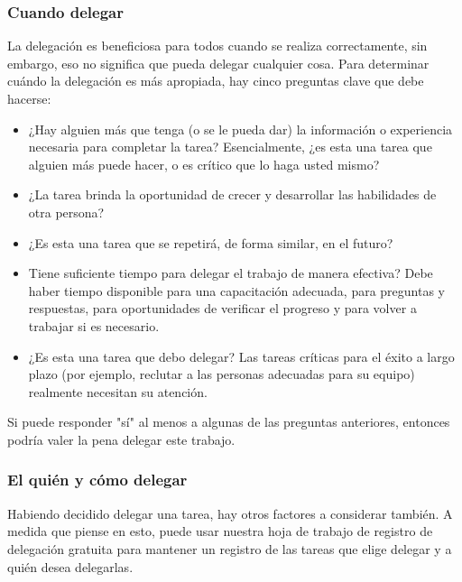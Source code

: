 \documentclass[10pt]{book}
\begin{document}
\subsubsection{Cuando delegar}
La delegación es beneficiosa para todos cuando se realiza correctamente, sin embargo, eso no significa que pueda delegar cualquier cosa. Para determinar cuándo la delegación es más apropiada, hay cinco preguntas clave que debe hacerse:
\begin{itemize}
\item ¿Hay alguien más que tenga (o se le pueda dar) la información o experiencia necesaria para completar la tarea? Esencialmente, ¿es esta una tarea que alguien más puede hacer, o es crítico que lo haga usted mismo?
\item ¿La tarea brinda la oportunidad de crecer y desarrollar las habilidades de otra persona?
\item ¿Es esta una tarea que se repetirá, de forma similar, en el futuro?
\item Tiene suficiente tiempo para delegar el trabajo de manera efectiva? Debe haber tiempo disponible para una capacitación adecuada, para preguntas y respuestas, para oportunidades de verificar el progreso y para volver a trabajar si es necesario.
\item ¿Es esta una tarea que debo delegar? Las tareas críticas para el éxito a largo plazo (por ejemplo, reclutar a las personas adecuadas para su equipo) realmente necesitan su atención.
\end{itemize}
Si puede responder "sí" al menos a algunas de las preguntas anteriores, entonces podría valer la pena delegar este trabajo.
\subsubsection{El quién y cómo delegar}
Habiendo decidido delegar una tarea, hay otros factores a considerar también. A medida que piense en esto, puede usar nuestra hoja de trabajo de registro de delegación gratuita para mantener un registro de las tareas que elige delegar y a quién desea delegarlas.
\end{document}
